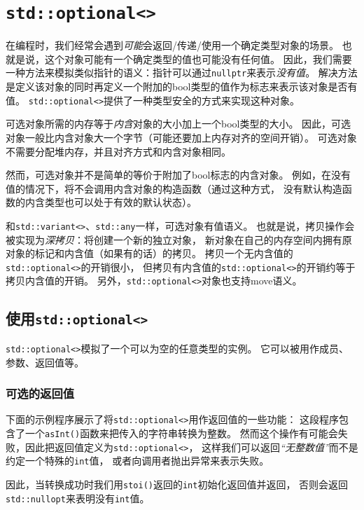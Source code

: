 \chapter{\texttt{std::optional<>}}\label{ch15}
在编程时，我们经常会遇到\emph{可能}会返回/传递/使用一个确定类型对象的场景。
也就是说，这个对象可能有一个确定类型的值也可能没有任何值。
因此，我们需要一种方法来模拟类似指针的语义：指针可以通过\texttt{nullptr}来表示\emph{没有值}。
解决方法是定义该对象的同时再定义一个附加的bool类型的值作为标志来表示该对象是否有值。
\texttt{std::optional<>}提供了一种类型安全的方式来实现这种对象。

可选对象所需的内存等于\emph{内含}对象的大小加上一个bool类型的大小。
因此，可选对象一般比内含对象大一个字节（可能还要加上内存对齐的空间开销）。
可选对象不需要分配堆内存，并且对齐方式和内含对象相同。

然而，可选对象并不是简单的等价于附加了bool标志的内含对象。
例如，在没有值的情况下，将不会调用内含对象的构造函数（通过这种方式，
没有默认构造函数的内含类型也可以处于有效的默认状态）。

和\texttt{std::variant<>}、\texttt{std::any}一样，可选对象有值语义。
也就是说，拷贝操作会被实现为\emph{深拷贝}：将创建一个新的独立对象，
新对象在自己的内存空间内拥有原对象的标记和内含值（如果有的话）的拷贝。
拷贝一个无内含值的\texttt{std::optional<>}的开销很小，
但拷贝有内含值的\texttt{std::optional<>}的开销约等于拷贝内含值的开销。
另外，\texttt{std::optional<>}对象也支持move语义。


\section{使用\texttt{std::optional<>}}
\texttt{std::optional<>}模拟了一个可以为空的任意类型的实例。
它可以被用作成员、参数、返回值等。

\subsection{可选的返回值}\label{ch15.1.1}
下面的示例程序展示了将\texttt{std::optional<>}用作返回值的一些功能：
这段程序包含了一个\texttt{asInt()}函数来把传入的字符串转换为整数。
然而这个操作有可能会失败，因此把返回值定义为\texttt{std::optional<>}，
这样我们可以返回\emph{“无整数值”}而不是约定一个特殊的\texttt{int}值，
或者向调用者抛出异常来表示失败。

因此，当转换成功时我们用\texttt{stoi()}返回的\texttt{int}初始化返回值并返回，
否则会返回\texttt{std::nullopt}来表明没有\texttt{int}值。

